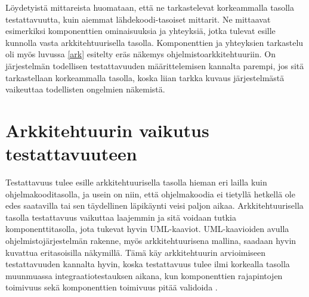 \documentclass[finnish]{tktltiki2}
\theoremstyle{definition}
\theoremstyle{remark}
\begin{document}


 
Löydetyistä mittareista huomataan, että ne tarkastelevat korkeammalla tasolla testattavuutta, kuin aiemmat lähdekoodi-tasoiset mittarit. Ne mittaavat esimerkiksi komponenttien ominaisuuksia ja yhteyksiä, jotka tulevat esille kunnolla vasta arkkitehtuurisella tasolla. Komponenttien ja yhteyksien tarkastelu oli myös luvussa \ref{ark} esitelty eräs näkemys ohjelmistoarkkitehtuuriin. On järjestelmän todellisen testattavuuden määrittelemisen kannalta parempi, jos sitä tarkastellaan korkeammalla tasolla, koska liian tarkka kuvaus järjestelmästä vaikeuttaa todellisten ongelmien näkemistä.  

\section{Arkkitehtuurin vaikutus testattavuuteen}

Testattavuus tulee esille arkkitehtuurisella tasolla hieman eri lailla kuin ohjelmakooditasolla, ja usein on niin, että ohjelmakoodia ei tietyllä hetkellä ole edes saatavilla tai sen täydellinen läpikäynti veisi paljon aikaa. Arkkitehtuurisella tasolla testattavuus vaikuttaa laajemmin ja sitä voidaan tutkia komponenttitasolla, jota tukevat hyvin UML-kaaviot. UML-kaavioiden avulla ohjelmistojärjestelmän rakenne, myös arkkitehtuurisena mallina, saadaan hyvin kuvattua eritasoisilla näkymillä. Tämä käy arkkitehtuurin arvioimiseen testattavuuden kannalta hyvin, koska testattavuus tulee ilmi korkealla tasolla muunmuassa integraatiotestauksen aikana, kun komponenttien rajapintojen toimivuus sekä komponenttien toimivuus pitää validoida \citep[s. 65]{Eickelmann:1996:MOS:243327.243602}.
\end{document}
